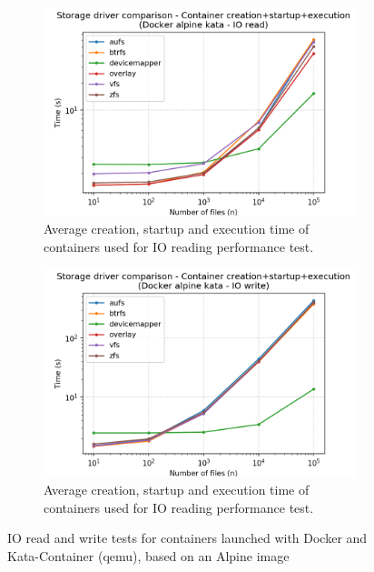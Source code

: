 \begin{figure}[!h]
    \begin{subfigure}{.5\textwidth}
      \centering
      \includegraphics[width=\linewidth]{images/storage-driver/storage-driver-full-Docker-alpine-kata---IO-read.png}
      \caption{Average creation, startup and execution time of containers used for IO reading performance test.}
      \label{fig:storage-driver:kata:io-read-full}
    \end{subfigure}
    \begin{subfigure}{.5\textwidth}
      \centering
      \includegraphics[width=\linewidth]{images/storage-driver/storage-driver-full-Docker-alpine-kata---IO-write.png}
      \caption{Average creation, startup and execution time of containers used for IO reading performance test.}
      \label{fig:storage-driver:kata:io-write-full}
    \end{subfigure}
    
    \caption{IO read and write tests for containers launched with Docker and Kata-Container (qemu), based on an Alpine image}
\end{figure}

